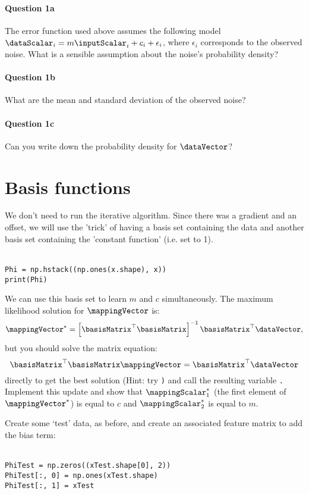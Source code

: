 \documentclass{article}
\newcommand{\mintinline}[1]{\colorbox{bg}{\lstinline[basicstyle=\ttfamily]{#1}}}
\begin{document}
\paragraph{Question 1a}
The error function used above assumes the following model $\dataScalar_i=m\inputScalar_i + c_i + \epsilon_i$, where $\epsilon_i$ corresponds to the observed noise. What is a
sensible assumption about the noise's probability density?

\paragraph{Question 1b}
What are the mean and standard deviation of the observed noise?

\paragraph{Question 1c}
Can you write down the probability density for $\bf \dataVector$?

\section{Basis functions}

We don't need to run the iterative algorithm. Since there was a gradient and an
offset, we will use the 'trick' of having a basis set containing the
data and another basis set containing the 'constant function'
(i.e. set to 1).\\ \ \\
\begin{verbatim}
Phi = np.hstack((np.ones(x.shape), x))
print(Phi)
\end{verbatim}


We can use this basis set to learn $m$ and $c$ simultaneously. 
The maximum likelihood solution for $\mappingVector$ is:
\[
\mappingVector^* = \left[\basisMatrix^{\top}\basisMatrix\right]^{-1}
\basisMatrix^\top \dataVector,
\]
but you should solve the matrix equation:
\[
\basisMatrix^{\top}\basisMatrix \mappingVector = \basisMatrix^\top \dataVector
\]
directly to get the best solution (Hint: try \texttt) and
call the resulting variable \texttt. Implement this update and show
that $\mappingScalar^*_1$ (the first element of $\mappingVector^*$) is equal to
$c$ and $\mappingScalar^*_2$ is equal to $m$.

Create some `test' data, as before, and create an associated feature matrix to
add the bias term:\\ \ \\
\begin{verbatim}
PhiTest = np.zeros((xTest.shape[0], 2))
PhiTest[:, 0] = np.ones(xTest.shape)
PhiTest[:, 1] = xTest
\end{verbatim}
\end{document}
